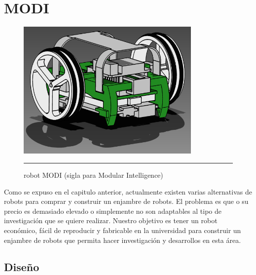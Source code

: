 
\chapter{MODI} %

\label{Chapter3} %


\begin{figure}[htbp]
	\centering
		\includegraphics[width=0.8\textwidth]{./Figures/MODI/render.png}
		\rule{35em}{0.5pt}
	\caption[Robot MODI]{robot MODI (sigla para Modular Intelligence)}
	\label{fig:MODI}
\end{figure}

Como se expuso en el capitulo anterior, actualmente existen varias alternativas de robots para comprar y construir un enjambre de robots. El problema es que o su precio es demasiado elevado o simplemente no son adaptables al tipo de investigación que se quiere realizar. Nuestro objetivo es tener un robot económico, fácil de reproducir y fabricable en la universidad para construir un enjambre de robots que permita hacer investigación y desarrollos en esta área.

\section{Diseño}

